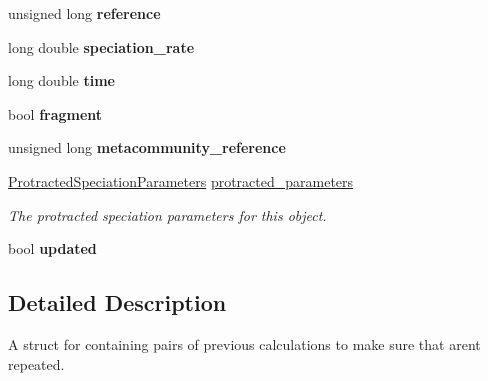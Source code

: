 \begin{DoxyCompactItemize}
\item 
unsigned long {\bfseries reference}\hypertarget{struct_community_parameters_a557474bb5acbee2483cf8176aaf2c2d6}{}\label{struct_community_parameters_a557474bb5acbee2483cf8176aaf2c2d6}

\item 
long double {\bfseries speciation\+\_\+rate}\hypertarget{struct_community_parameters_afafe9532c12b83693d04cf63d56f0133}{}\label{struct_community_parameters_afafe9532c12b83693d04cf63d56f0133}

\item 
long double {\bfseries time}\hypertarget{struct_community_parameters_adb03228a8993f9e2e52f3dda85a96ec8}{}\label{struct_community_parameters_adb03228a8993f9e2e52f3dda85a96ec8}

\item 
bool {\bfseries fragment}\hypertarget{struct_community_parameters_a358d21a0a083749d05f0d01f08f2ca14}{}\label{struct_community_parameters_a358d21a0a083749d05f0d01f08f2ca14}

\item 
unsigned long {\bfseries metacommunity\+\_\+reference}\hypertarget{struct_community_parameters_a10584c438483add52d9d8790256f2cc0}{}\label{struct_community_parameters_a10584c438483add52d9d8790256f2cc0}

\item 
\hyperlink{struct_protracted_speciation_parameters}{Protracted\+Speciation\+Parameters} \hyperlink{struct_community_parameters_a66b5c80222306886e151da2fa7a1a290}{protracted\+\_\+parameters}\hypertarget{struct_community_parameters_a66b5c80222306886e151da2fa7a1a290}{}\label{struct_community_parameters_a66b5c80222306886e151da2fa7a1a290}

\begin{DoxyCompactList}\small\item\em The protracted speciation parameters for this object. \end{DoxyCompactList}\item 
bool {\bfseries updated}\hypertarget{struct_community_parameters_aada886c5f72515e6eca62efdcccf47b7}{}\label{struct_community_parameters_aada886c5f72515e6eca62efdcccf47b7}

\end{DoxyCompactItemize}


\subsection{Detailed Description}
A struct for containing pairs of previous calculations to make sure that aren\textquotesingle{}t repeated. 

